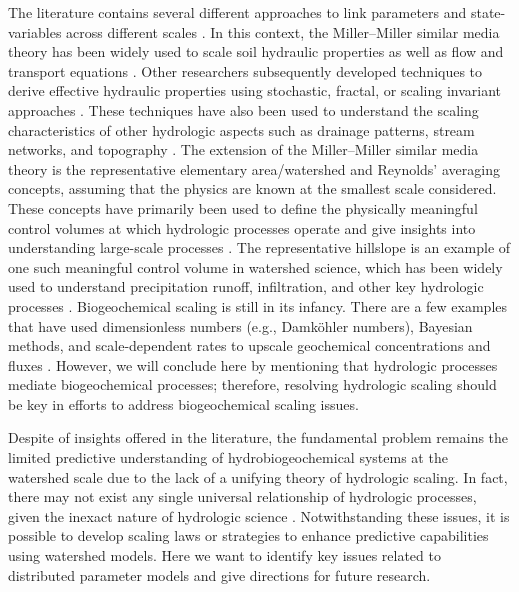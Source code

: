 \documentclass[preprint,review, 12pt]{elsarticle}
\begin{document}
The literature contains several different approaches to link parameters and state-variables across different scales \citep{Bloschl1995}. In this context, the Miller--Miller similar media theory has been widely used to scale soil hydraulic properties as well as flow and transport equations \citep{Miller1956, Sadeghi2016}. Other researchers subsequently developed techniques to derive effective hydraulic properties using stochastic, fractal, or scaling invariant approaches \citep{Russo1993, Mohanty2000, RodriguezIturbe1998}. These techniques have also been used to understand the scaling characteristics of other hydrologic aspects such as drainage patterns, stream networks, and topography \citep{Gupta1990, Sivapalan2011}. The extension of the Miller--Miller similar media theory is the representative elementary area/watershed and Reynolds’ averaging concepts, assuming that the physics are known at the smallest scale considered. These concepts have primarily been used to define the physically meaningful control volumes at which hydrologic processes operate and give insights into understanding large-scale processes \citep{Wood1988, Reggiani1998, Reggiani1999, Reggiani2001}. The representative hillslope is an example of one such meaningful control volume in watershed science, which has been widely used to understand precipitation runoff, infiltration, and other key hydrologic processes \citep{Troch2003, Troch2015, Hazenberg2015, Hazenberg2016a}. Biogeochemical scaling is still in its infancy. There are a few examples that have used dimensionless numbers (e.g., Damk\"ohler numbers), Bayesian methods, and scale-dependent rates to upscale geochemical concentrations and fluxes \citep{Gu2007, Li2008, Arora2015, Dwivedi2016a}. However, we will conclude here by mentioning that hydrologic processes mediate biogeochemical processes; therefore, resolving hydrologic scaling should be key in efforts to address biogeochemical scaling issues.

Despite of insights offered in the literature, the fundamental problem remains the limited predictive understanding of hydrobiogeochemical systems at the watershed scale due to the lack of a unifying theory of hydrologic scaling. In fact, there may not exist any single universal relationship of hydrologic processes, given the inexact nature of hydrologic science \citep{Bloschl1995, Beven2006a}. Notwithstanding these issues, it is possible to develop scaling laws or strategies to enhance predictive capabilities using watershed models. Here we want to identify key issues related to distributed parameter models and give directions for future research.
\end{document}
